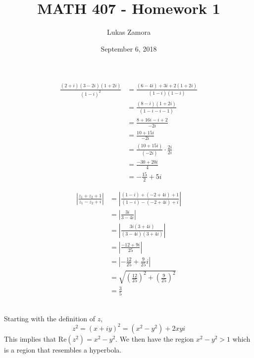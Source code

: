 \documentclass{article}
\newenvironment{problem}[2][Problem]{\begin{trivlist}
		\item[\hskip \labelsep {\bfseries #1}\hskip \labelsep {\bfseries #2.}]}{\end{trivlist}}
\begin{document}
	
	\title{MATH 407 - Homework 1}
	\author{Lukas Zamora}
	\date{September 6, 2018}
	\maketitle
	
	\begin{problem}{1.53(g)}
		\begin{align*}
			\frac{(2+i)(3-2i)(1+2i)}{(1-i)^2} &= \frac{(6-4i)+3i+2(1+2i)}{(1-i)(1-i)} \\
			&= \frac{(8-i)(1+2i)}{(1-i-i-1)} \\
			&= \frac{8+16i-i+2}{-2i} \\
			&= \frac{10+15i}{-2i} \\
			&= \frac{(10+15i)}{(-2i)} \cdot \frac{2i}{2i} \\
			&= \frac{-30 + 20i}{4} \\
			&= \boxed{-\frac{15}{2} + 5i}
		\end{align*}
	\end{problem}

	
	\begin{problem}{1.54(e)}
		\begin{align*}
			\left| \frac{z_1 + z_2 + 1}{z_1 - z_2 + i} \right| &= \left| \frac{(1-i) + (-2+4i) + 1}{(1-i) - (-2+4i) + i} \right| \\
			&= \left| \frac{3i}{3-4i} \right| \\
			&= \left| \frac{3i(3+4i)}{(3-4i)(3+4i)} \right| \\
			&= \left| \frac{-12+9i}{25} \right| \\
			&= \left| -\frac{12}{25} + \frac{9}{25}i \right| \\
			&= \sqrt{\left(\frac{12}{25}\right)^2 + \left(\frac{9}{25}\right)^2} \\
			&= \boxed{\frac{3}{5}}
		\end{align*}
	\end{problem}

	
	\begin{problem}{1.73(b)} $ $\\ \\
		Starting with the definition of $ z $,
		$$ z^2 = (x+iy)^2 = (x^2-y^2) + 2xyi$$
		This implies that $\text{Re}(z^2) = x^2-y^2 $. We then have the region $ x^2-y^2 > 1 $ which is a region that resembles a hyperbola. 
	\end{problem}
\end{document}
